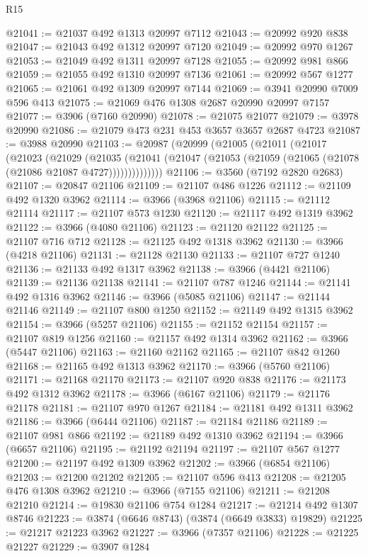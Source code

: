 \begin{lexlean}{R15}
\begin{coremodule}
@21041 := @21037 @492 @1313 @20997 @7112
@21043 := @20992 @920 @838
@21047 := @21043 @492 @1312 @20997 @7120
@21049 := @20992 @970 @1267
@21053 := @21049 @492 @1311 @20997 @7128
@21055 := @20992 @981 @866
@21059 := @21055 @492 @1310 @20997 @7136
@21061 := @20992 @567 @1277
@21065 := @21061 @492 @1309 @20997 @7144
@21069 := @3941 @20990 @7009 @596 @413
@21075 := @21069 @476 @1308 @2687 @20990 @20997 @7157
@21077 := @3906 (@7160 @20990)
@21078 := @21075 @21077
@21079 := @3978 @20990
@21086 := @21079 @473 @231 @453 @3657 @3657 @2687 @4723
@21087 := @3988 @20990
@21103 := @20987
    (@20999
      (@21005
        (@21011
          (@21017
            (@21023
              (@21029
                (@21035
                  (@21041 (@21047 (@21053 (@21059 (@21065 (@21078 (@21086 @21087 @4727))))))))))))))
@21106 := @3560 (@7192 @2820 @2683)
@21107 := @20847 @21106
@21109 := @21107 @486 @1226
@21112 := @21109 @492 @1320 @3962
@21114 := @3966 (@3968 @21106)
@21115 := @21112 @21114
@21117 := @21107 @573 @1230
@21120 := @21117 @492 @1319 @3962
@21122 := @3966 (@4080 @21106)
@21123 := @21120 @21122
@21125 := @21107 @716 @712
@21128 := @21125 @492 @1318 @3962
@21130 := @3966 (@4218 @21106)
@21131 := @21128 @21130
@21133 := @21107 @727 @1240
@21136 := @21133 @492 @1317 @3962
@21138 := @3966 (@4421 @21106)
@21139 := @21136 @21138
@21141 := @21107 @787 @1246
@21144 := @21141 @492 @1316 @3962
@21146 := @3966 (@5085 @21106)
@21147 := @21144 @21146
@21149 := @21107 @800 @1250
@21152 := @21149 @492 @1315 @3962
@21154 := @3966 (@5257 @21106)
@21155 := @21152 @21154
@21157 := @21107 @819 @1256
@21160 := @21157 @492 @1314 @3962
@21162 := @3966 (@5447 @21106)
@21163 := @21160 @21162
@21165 := @21107 @842 @1260
@21168 := @21165 @492 @1313 @3962
@21170 := @3966 (@5760 @21106)
@21171 := @21168 @21170
@21173 := @21107 @920 @838
@21176 := @21173 @492 @1312 @3962
@21178 := @3966 (@6167 @21106)
@21179 := @21176 @21178
@21181 := @21107 @970 @1267
@21184 := @21181 @492 @1311 @3962
@21186 := @3966 (@6444 @21106)
@21187 := @21184 @21186
@21189 := @21107 @981 @866
@21192 := @21189 @492 @1310 @3962
@21194 := @3966 (@6657 @21106)
@21195 := @21192 @21194
@21197 := @21107 @567 @1277
@21200 := @21197 @492 @1309 @3962
@21202 := @3966 (@6854 @21106)
@21203 := @21200 @21202
@21205 := @21107 @596 @413
@21208 := @21205 @476 @1308 @3962
@21210 := @3966 (@7155 @21106)
@21211 := @21208 @21210
@21214 := @19830 @21106 @754 @1284
@21217 := @21214 @492 @1307 @8746
@21223 := @3874 (@6646 @8743) (@3874 (@6649 @3833) @19829)
@21225 := @21217 @21223 @3962
@21227 := @3966 (@7357 @21106)
@21228 := @21225 @21227
@21229 := @3907 @1284

\end{coremodule}
\end{lexlean}
